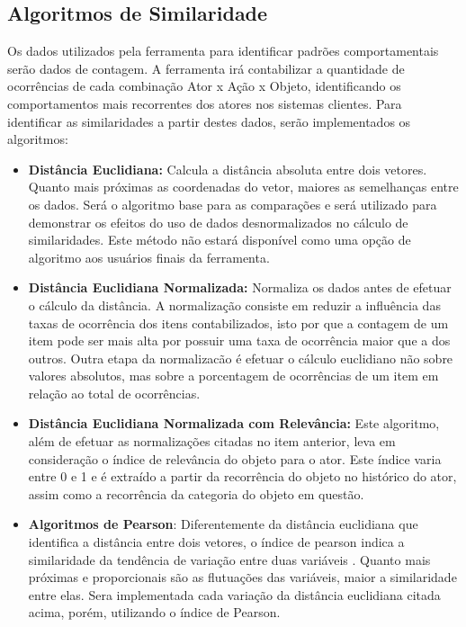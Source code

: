 \documentclass[
	12pt,				%
    oneside,			%
	a4paper,			%
	english,			%
	french,				%
	spanish,			%
	brazil,				%
	]{abntex2}
\begin{document}
\subsection{Algoritmos de Similaridade}
Os dados utilizados pela ferramenta para identificar padrões comportamentais serão dados de contagem. A ferramenta irá contabilizar a quantidade de ocorrências de cada combinação Ator x Ação x Objeto, identificando
os comportamentos mais recorrentes dos atores nos sistemas clientes. Para identificar as similaridades a partir destes dados, serão implementados os algoritmos:

\begin{itemize}
	\item \textbf{Distância Euclidiana:} Calcula a distância absoluta entre dois vetores. Quanto mais próximas as coordenadas do vetor, maiores as semelhanças entre os dados. Será o algoritmo base para as comparações e será utilizado para demonstrar os efeitos do uso de dados desnormalizados no cálculo de similaridades. Este método não estará disponível como uma opção de algoritmo aos usuários finais da ferramenta.
	\item \textbf{Distância Euclidiana Normalizada:} Normaliza os dados antes de efetuar o cálculo da distância. A normalização consiste em reduzir a influência das taxas de ocorrência dos itens contabilizados, isto por que a contagem de um item
	pode ser mais alta por possuir uma taxa de ocorrência maior que a dos outros. Outra etapa da normalizacão é efetuar o cálculo euclidiano não sobre valores absolutos, mas sobre a porcentagem de ocorrências de um item em relação ao total de ocorrências.
	\item \textbf{Distância Euclidiana Normalizada com Relevância:} Este algoritmo, além de efetuar as normalizações citadas no item anterior, leva em consideração o índice de relevância do objeto para o ator. Este índice varia entre 0 e 1 e é extraído a 
	partir da recorrência do objeto no histórico do ator, assim como a recorrência da categoria do objeto em questão.
	\item \textbf{Algoritmos de Pearson}: Diferentemente da distância euclidiana que identifica a distância entre dois vetores, o índice de pearson indica a similaridade da tendência de variação entre duas variáveis \cite{9-CorrelationBetweenVariables}. Quanto mais próximas e proporcionais são as flutuações 
	das variáveis, maior a similaridade entre elas. Sera implementada cada variação da distância euclidiana citada acima, porém, utilizando o índice de Pearson.
\end{itemize} 
\end{document}
